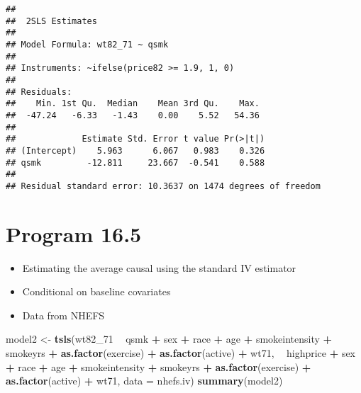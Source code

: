 \documentclass[
  10pt,
]{book}
\newenvironment{Shaded}{\begin{snugshade}}{\end{snugshade}}
\newcommand{\DataTypeTok}[1]{\textcolor[rgb]{0.13,0.29,0.53}{#1}}
\newcommand{\DecValTok}[1]{\textcolor[rgb]{0.00,0.00,0.81}{#1}}
\newcommand{\KeywordTok}[1]{\textcolor[rgb]{0.13,0.29,0.53}{\textbf{#1}}}
\newcommand{\NormalTok}[1]{#1}
\newcommand{\OperatorTok}[1]{\textcolor[rgb]{0.81,0.36,0.00}{\textbf{#1}}}
\newcommand{\StringTok}[1]{\textcolor[rgb]{0.31,0.60,0.02}{#1}}
\providecommand{\tightlist}{%
  \setlength{\itemsep}{0pt}\setlength{\parskip}{0pt}}
\begin{document}
\begin{verbatim}
## 
##  2SLS Estimates
## 
## Model Formula: wt82_71 ~ qsmk
## 
## Instruments: ~ifelse(price82 >= 1.9, 1, 0)
## 
## Residuals:
##    Min. 1st Qu.  Median    Mean 3rd Qu.    Max. 
##  -47.24   -6.33   -1.43    0.00    5.52   54.36 
## 
##             Estimate Std. Error t value Pr(>|t|)
## (Intercept)    5.963      6.067   0.983    0.326
## qsmk         -12.811     23.667  -0.541    0.588
## 
## Residual standard error: 10.3637 on 1474 degrees of freedom
\end{verbatim}

\hypertarget{program-16.5}{%
\section{Program 16.5}\label{program-16.5}}

\begin{itemize}
\tightlist
\item
  Estimating the average causal using the standard IV estimator
\item
  Conditional on baseline covariates
\item
  Data from NHEFS
\end{itemize}

\begin{Shaded}
\begin{Highlighting}[]
\NormalTok{model2 <-}\StringTok{ }\KeywordTok{tsls}\NormalTok{(wt82_}\DecValTok{71} \OperatorTok{~}\StringTok{ }\NormalTok{qsmk }\OperatorTok{+}\StringTok{ }\NormalTok{sex }\OperatorTok{+}\StringTok{ }\NormalTok{race }\OperatorTok{+}\StringTok{ }\NormalTok{age }\OperatorTok{+}\StringTok{ }\NormalTok{smokeintensity }\OperatorTok{+}\StringTok{ }\NormalTok{smokeyrs }\OperatorTok{+}\StringTok{ }
\StringTok{                      }\KeywordTok{as.factor}\NormalTok{(exercise) }\OperatorTok{+}\StringTok{ }\KeywordTok{as.factor}\NormalTok{(active) }\OperatorTok{+}\StringTok{ }\NormalTok{wt71,}
             \OperatorTok{~}\StringTok{ }\NormalTok{highprice }\OperatorTok{+}\StringTok{ }\NormalTok{sex }\OperatorTok{+}\StringTok{ }\NormalTok{race }\OperatorTok{+}\StringTok{ }\NormalTok{age }\OperatorTok{+}\StringTok{ }\NormalTok{smokeintensity }\OperatorTok{+}\StringTok{ }\NormalTok{smokeyrs }\OperatorTok{+}\StringTok{ }\KeywordTok{as.factor}\NormalTok{(exercise) }\OperatorTok{+}
\StringTok{               }\KeywordTok{as.factor}\NormalTok{(active) }\OperatorTok{+}\StringTok{ }\NormalTok{wt71, }\DataTypeTok{data =}\NormalTok{ nhefs.iv)}
\KeywordTok{summary}\NormalTok{(model2)}
\end{Highlighting}
\end{Shaded}
\end{document}
